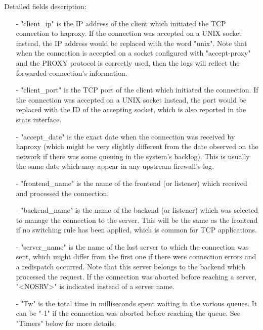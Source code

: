 Detailed fields description:
\begin{itemize}
\item[-]
    "client\_ip" is the IP address of the client which initiated the TCP
    connection to haproxy. If the connection was accepted on a UNIX socket
    instead, the IP address would be replaced with the word "unix". Note that
    when the connection is accepted on a socket configured with "accept-proxy"
    and the PROXY protocol is correctly used, then the logs will reflect the
    forwarded connection's information.

\item[-]
    "client\_port" is the TCP port of the client which initiated the connection.
    If the connection was accepted on a UNIX socket instead, the port would be
    replaced with the ID of the accepting socket, which is also reported in the
    stats interface.

\item[-]
    "accept\_date" is the exact date when the connection was received by haproxy
    (which might be very slightly different from the date observed on the
    network if there was some queuing in the system's backlog). This is usually
    the same date which may appear in any upstream firewall's log.

\item[-]
    "frontend\_name" is the name of the frontend (or listener) which received
    and processed the connection.

\item[-]
    "backend\_name" is the name of the backend (or listener) which was selected
    to manage the connection to the server. This will be the same as the
    frontend if no switching rule has been applied, which is common for TCP
    applications.

\item[-]
    "server\_name" is the name of the last server to which the connection was
    sent, which might differ from the first one if there were connection errors
    and a redispatch occurred. Note that this server belongs to the backend
    which processed the request. If the connection was aborted before reaching
    a server, "<NOSRV>" is indicated instead of a server name.

\item[-]
    "Tw" is the total time in milliseconds spent waiting in the various queues.
    It can be "-1" if the connection was aborted before reaching the queue.
    See "Timers" below for more details.


\end{itemize}
